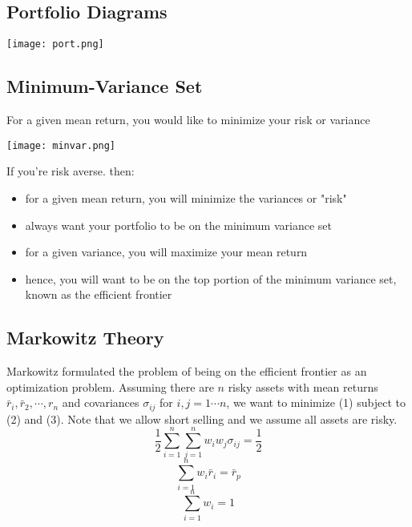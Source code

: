 \documentclass[11pt]{article}
\begin{document}
\subsection{Portfolio Diagrams}
\begin{center}
\texttt{[image: port.png]} 
\end{center}

\subsection{Minimum-Variance Set}
For a given mean return, you would like to minimize your risk or variance
\begin{center}
\texttt{[image: minvar.png]} 
\end{center}
If you're risk averse. then:
\begin{itemize}
\item for a given mean return, you will minimize the variances or "risk"
\item always want your portfolio to be on the minimum variance set
\item for a given variance, you will maximize your mean return
\item hence, you will want to be on the top portion of the minimum variance set, known as the efficient frontier
\end{itemize}

\subsection{Markowitz Theory}
Markowitz formulated the problem of being on the efficient frontier as an optimization problem. Assuming there are $n$ risky assets with mean returns $\bar{r}_i, \bar{r}_2, \cdots, r_n$ and covariances $\sigma_{ij}$ for $i,j = 1 \cdots n$, we want to minimize (1) subject to (2) and (3). Note that  we allow short selling and we assume all assets are risky.
\begin{equation}
 \frac{1}{2} \sum_{i=1}^n \sum_{j=1}^n w_iw_j \sigma_{ij} = \frac{1}{2}
\end{equation}
\begin{equation}
 \sum_{i=1}^n w_i\bar{r}_i = \bar{r}_p 
\end{equation}
\begin{equation}
 \sum_{i=1}^n w_i =1 
\end{equation}
\pagebreak
\end{document}
